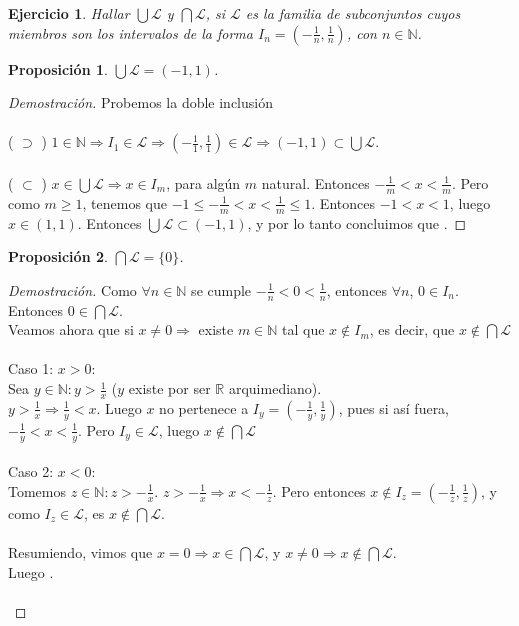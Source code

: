 \documentclass{article}
\newtheorem*{ejercicio}{Ejercicio}
\newtheorem*{proposicion}{Proposición}
\begin{document}
\begin{ejercicio}
Hallar $\bigcup\mathscr{L}$ y $\bigcap\mathscr{L}$, si $\mathscr{L}$ es la familia de subconjuntos cuyos miembros son los intervalos de la forma $I_n = (-\frac{1}{n}, \frac{1}{n})$, con $n \in \mathbb{N}$.
\end{ejercicio}
\begin{proposicion}
$\bigcup\mathscr{L} = (-1, 1)$.
\end{proposicion}
\begin{proof}[Demostración] Probemos la doble inclusión \\ \\
( $\supset$ )   $1 \in \mathbb{N} \Rightarrow I_1 \in \mathscr{L} \Rightarrow (-\frac{1}{1}, \frac{1}{1}) \in \mathscr{L} \Rightarrow (-1, 1) \subset \bigcup\mathscr{L}$.  \\ \\
( $\subset$ ) $x \in \bigcup\mathscr{L} \Rightarrow x \in I_m$, para algún $m$ natural. Entonces $-\frac{1}{m} < x < \frac{1}{m}$. Pero como $m \ge 1$, tenemos que  $-1 \le -\frac{1}{m} < x < \frac{1}{m} \le 1$. Entonces $-1 < x < 1$, luego $x \in (1, 1)$. Entonces $\bigcup\mathscr{L} \subset (-1,1)$, y por lo tanto concluimos que .
\end{proof}



\begin{proposicion}
$\bigcap\mathscr{L} = \{0\}$.
\end{proposicion}

\begin{proof}[Demostración]
Como $\forall n \in \mathbb{N}$ se cumple $-\frac{1}{n} < 0 < \frac{1}{n}$, entonces $\forall n$, $0 \in I_n$. Entonces $0 \in \bigcap\mathscr{L}$. \\ Veamos ahora que si $x \ne 0 \Rightarrow$ existe $m \in \mathbb{N}$ tal que $x \notin I_m$, es decir, que $x \notin \bigcap\mathscr{L}$
\\ \\
Caso 1: $x > 0$: \\
Sea $y \in \mathbb{N}: y > \frac{1}{x}$ ($y$ existe por ser $\mathbb{R}$ arquimediano).\\ $y > \frac{1}{x} \Rightarrow \frac{1}{y} < x$. Luego $x$ no pertenece a $I_y = (-\frac{1}{y}, \frac{1}{y})$, pues si así fuera, $-\frac{1}{y} < x < \frac{1}{y}$. Pero $I_y \in \mathscr{L}$, luego $x\notin \bigcap\mathscr{L}$ \\\\
Caso 2: $x < 0$: \\
Tomemos $z \in \mathbb{N}: z > -\frac{1}{x}$. $z > -\frac{1}{x} \Rightarrow x < -\frac{1}{z}$. Pero entonces $x \notin I_z = (-\frac{1}{z}, \frac{1}{z})$, y como $I_z \in \mathscr{L}$, es $x \notin \bigcap\mathscr{L}$. \\ \\
Resumiendo, vimos que $x = 0 \Rightarrow x \in \bigcap\mathscr{L}$, y $x \ne 0 \Rightarrow x \notin \bigcap\mathscr{L}$. \\ Luego . \\ \\
\end{proof}
\end{document}
